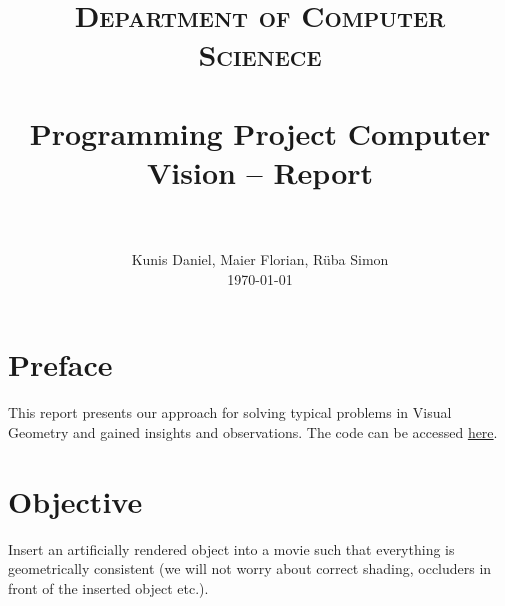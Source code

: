 \documentclass[paper=a4, fontsize=11pt]{scrartcl}
\title{
		\usefont{OT1}{bch}{b}{n}
		\normalfont \normalsize \textsc{Department of Computer Scienece} \\ [25pt]
		\horrule{0.5pt} \\[0.4cm]
		\huge Programming Project Computer Vision -- Report \\
		\horrule{2pt} \\[0.5cm]
}
\author{
		\normalfont 								\normalsize
        Kunis Daniel, Maier Florian, Rüba Simon\\[-3pt]		\normalsize
        \today
}
\date{}
\numberwithin{equation}{section}		%
\numberwithin{figure}{section}			%
\numberwithin{table}{section}				%
\begin{document}
\maketitle
\section*{Preface}
This report presents our approach for solving typical problems in Visual Geometry and gained insights and observations. The code can be accessed \href{https://git.uibk.ac.at/csat8361/visualgeometry}{here}.

\section*{Objective}
Insert an artificially rendered object into a movie such that everything is geometrically consistent (we will not worry about correct shading, occluders in front of the inserted object etc.).
\end{document}
